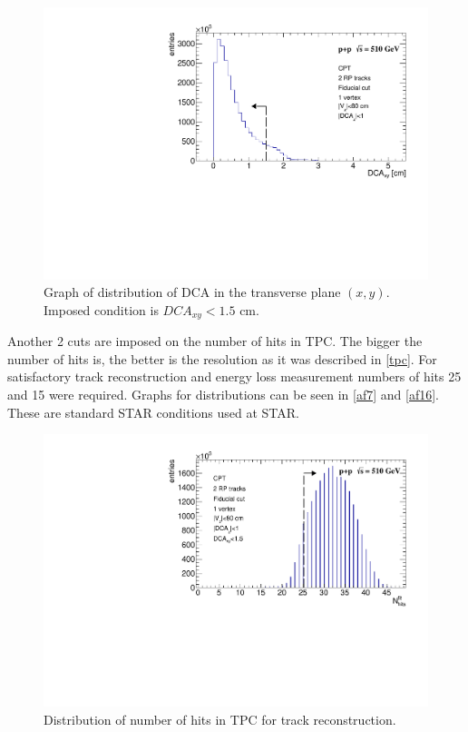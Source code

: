 \begin{figure}[ht]
    \centering
    \includegraphics[width=1\textwidth]{figures/hDcaXY.pdf}
    \caption[Distribution of DCA $(x,y)$ plane] {Graph of distribution of DCA in the transverse plane $(x,y)$. Imposed condition is $DCA_{xy} < 1.5$ cm.}
    \label{af17}
\end{figure}
\FloatBarrier
Another 2 cuts are imposed on the number of hits in TPC. The bigger the number of hits is, the better is the resolution as it was described in \autoref{tpc}. For satisfactory track reconstruction and energy loss measurement numbers of hits 25 and 15 were required. Graphs for distributions can be seen in \autoref{af7} and \autoref{af16}. These are standard STAR conditions used at STAR.

\FloatBarrier
\begin{figure}[ht]
    \centering
    \includegraphics[width=1\textwidth]{figures/hNfitHits.pdf}
    \caption[Distribution of number of hits in TPC for track reconstruction]{Distribution of number of hits in TPC for track reconstruction.}
    \label{af7}
\end{figure}
\FloatBarrier

